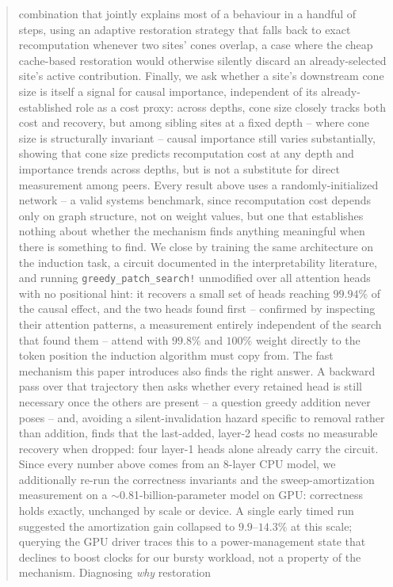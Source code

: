 \documentclass{article}
\begin{document}
\begin{abstract}
combination that jointly explains most of a behaviour in a handful of steps, using an adaptive
restoration strategy that falls back to exact recomputation whenever two sites' cones overlap, a
case where the cheap cache-based restoration would otherwise silently discard an already-selected
site's active contribution. Finally, we ask whether a site's downstream cone size is itself a
signal for causal importance, independent of its already-established role as a cost proxy: across
depths, cone size closely tracks both cost and recovery, but among sibling sites at a fixed depth
-- where cone size is structurally invariant -- causal importance still varies substantially,
showing that cone size predicts recomputation cost at any depth and importance trends across
depths, but is not a substitute for direct measurement among peers. Every result above uses a
randomly-initialized network -- a valid systems benchmark, since recomputation cost depends only
on graph structure, not on weight values, but one that establishes nothing about whether the
mechanism finds anything meaningful when there is something to find. We close by training the same
architecture on the induction task, a circuit documented in the interpretability literature, and
running \texttt{greedy\_patch\_search!} unmodified over all attention heads with no positional
hint: it recovers a small set of heads reaching $99.94\%$ of the causal effect, and the two heads
found first -- confirmed by inspecting their attention patterns, a measurement entirely
independent of the search that found them -- attend with $99.8\%$ and $100\%$ weight directly to
the token position the induction algorithm must copy from. The fast mechanism this paper
introduces also finds the right answer. A backward pass over that trajectory then asks whether
every retained head is still necessary once the others are present -- a question greedy addition
never poses -- and, avoiding a silent-invalidation hazard specific to removal rather than addition,
finds that the last-added, layer-2 head costs no measurable recovery when dropped: four layer-1
heads alone already carry the circuit. Since every number above comes from an 8-layer CPU model,
we additionally re-run the correctness invariants and the sweep-amortization measurement on a
$\sim$0.81-billion-parameter model on GPU: correctness holds exactly, unchanged by scale or device.
A single early timed run suggested the amortization gain collapsed to $9.9$--$14.3\%$ at this
scale; querying the GPU driver traces this to a power-management state that declines to boost
clocks for our bursty workload, not a property of the mechanism. Diagnosing \emph{why} restoration

\end{abstract}
\end{document}
